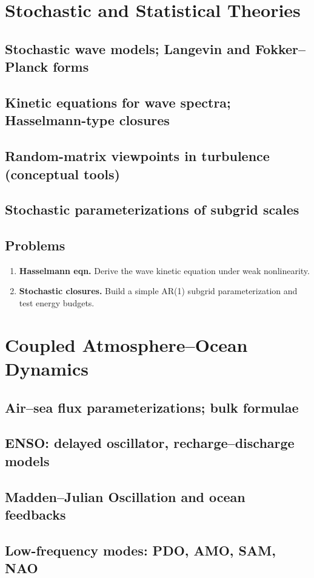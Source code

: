 \documentclass[12pt]{book}
\begin{document}
\chapter{Stochastic and Statistical Theories}
\section{Stochastic wave models; Langevin and Fokker--Planck forms}
\section{Kinetic equations for wave spectra; Hasselmann-type closures}
\section{Random-matrix viewpoints in turbulence (conceptual tools)}
\section{Stochastic parameterizations of subgrid scales}
\section*{Problems}
\begin{enumerate}
  \item \textbf{Hasselmann eqn.} Derive the wave kinetic equation under weak nonlinearity.
  \item \textbf{Stochastic closures.} Build a simple AR(1) subgrid parameterization and test energy budgets.
\end{enumerate}

\chapter{Coupled Atmosphere--Ocean Dynamics}
\section{Air--sea flux parameterizations; bulk formulae}
\section{ENSO: delayed oscillator, recharge--discharge models}
\section{Madden--Julian Oscillation and ocean feedbacks}
\section{Low-frequency modes: PDO, AMO, SAM, NAO}
\end{document}
